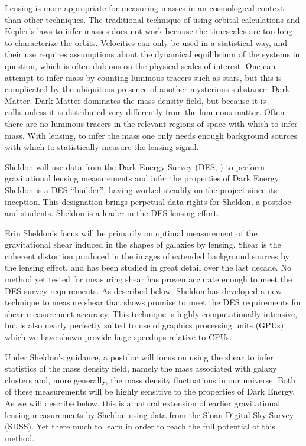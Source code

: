 \documentclass[12pt]{article}
\begin{document}
Lensing is more appropriate for measuring masses in an cosmological context
than other techniques.  The traditional technique of using orbital calculations
and Kepler's laws to infer masses does not work because the timescales are too
long to characterize the orbits. Velocities can only be used in a statistical
way, and their use requires assumptions about the dynamical equilibrium of the
systems in question, which is often dubious on the physical scales of interest.
One can attempt to infer mass by counting luminous tracers such as stars, but
this is complicated by the ubiquitous presence of another mysterious substance:
Dark Matter.  Dark Matter dominates the mass density field, but because it is
collisionless it is distributed very differently from the luminous matter.
Often there are no luminous tracers in the relevant regions of space with which
to infer mass.  With lensing, to infer the mass one only needs enough
background sources with which to statistically measure the lensing signal.

Sheldon will use data from the Dark Energy Survey (DES, \cite{DESWhitePaper})
to perform gravitational lensing measurements and infer the properties of Dark
Energy.  Sheldon is a DES ``builder'', having worked steadily on the project
since its inception.  This designation brings perpetual data rights for
Sheldon, a postdoc and students.  Sheldon is a leader in the DES lensing
effort.  

Erin Sheldon's focus will be primarily on optimal measurement of the
gravitational shear induced in the shapes of galaxies by lensing. Shear is the
coherent distortion produced in the images of extended background sources by
the lensing effect, and has been studied in great detail over the last decade.
No method yet tested for measuring shear has proven accurate enough to meet the
DES survey requirements.  As described below, Sheldon has developed a new
technique to measure shear that shows promise to meet the DES requirements for
shear measurement accuracy.  This technique is highly computationally
intensive, but is also nearly perfectly suited to use of graphics processing
units (GPUs) which we have shown provide huge speedups relative to CPUs.

Under Sheldon's guidance, a postdoc will focus on using the shear to infer
statistics of the mass density field, namely the mass associated with galaxy
clusters and, more generally, the mass density fluctuations in our universe.
Both of these measurements will be highly sensitive to the properties of Dark
Energy.   As we will describe below, this is a natural extension of earlier
gravitational lensing measurements by Sheldon using data from the Sloan Digital
Sky Survey (SDSS).  Yet there much to learn in order to reach the full
potential of this method.
\end{document}
